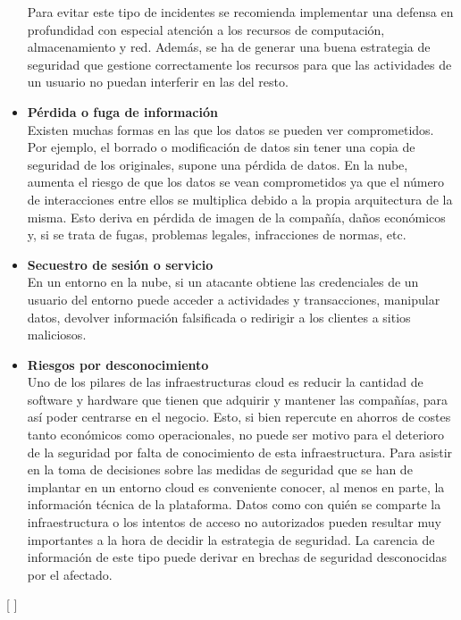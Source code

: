 \begin{itemize}
Para evitar este tipo de incidentes se recomienda implementar una defensa en profundidad con especial atención a los recursos de computación, almacenamiento y red. Además, se ha de generar una buena estrategia de seguridad que gestione correctamente los recursos para que las actividades de un usuario no puedan interferir en las del resto. 
	\item \textbf {Pérdida o fuga de información} \\ Existen muchas formas en las que los datos se pueden ver comprometidos. Por ejemplo, el borrado o modificación de datos sin tener una copia de seguridad de los originales, supone una pérdida de datos. 
En la nube, aumenta el riesgo de que los datos se vean comprometidos ya que el número de interacciones entre ellos se multiplica debido a la propia arquitectura de la misma. Esto deriva en pérdida de imagen de la compañía, daños económicos y, si se trata de fugas, problemas legales, infracciones de normas, etc.
	\item \textbf {Secuestro de sesión o servicio} \\  En un entorno en la nube, si un atacante obtiene las credenciales de un usuario del entorno puede acceder a actividades y transacciones, manipular datos, devolver información falsificada o redirigir a los clientes a sitios maliciosos.
	\item \textbf {Riesgos por desconocimiento} \\ Uno de los pilares de las infraestructuras cloud es reducir la cantidad de software y hardware que tienen que adquirir y mantener las compañías, para así poder centrarse en el negocio. Esto, si bien repercute en ahorros de costes tanto económicos como operacionales, no puede ser motivo para el deterioro de la seguridad por falta de conocimiento de esta infraestructura. 
Para asistir en la toma de decisiones sobre las medidas de seguridad que se han de implantar en un entorno cloud es conveniente conocer, al menos en parte, la información técnica de la plataforma. Datos como con quién se comparte la infraestructura o los intentos de acceso no autorizados pueden resultar muy importantes a la hora de decidir la estrategia de seguridad. 
La carencia de información de este tipo puede derivar en brechas de seguridad desconocidas por el afectado. 
\end{itemize}  [  ]



